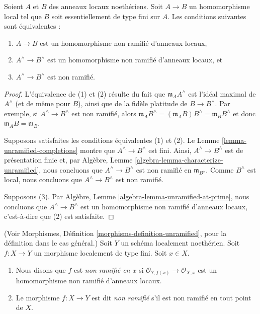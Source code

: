\begin{lemma}
\label{lemma-characterize-unramified-completions}
Soient $A$ et $B$ des anneaux locaux noethériens.
Soit $A \to B$ un homomorphisme local tel que $B$ soit
essentiellement de type fini sur $A$.
Les conditions suivantes sont équivalentes :
\begin{enumerate}
\item $A \to B$ est un homomorphisme non ramifié d'anneaux locaux,
\item $A^\wedge \to B^\wedge$ est un homomorphisme non ramifié d'anneaux locaux, et
\item $A^\wedge \to B^\wedge$ est non ramifié.
\end{enumerate}
\end{lemma}

\begin{proof}
L'équivalence de (1) et (2) résulte du fait que
$\mathfrak m_AA^\wedge$ est l'idéal maximal de $A^\wedge$
(et de même pour $B$), ainsi que de la fidèle platitude de $B \to B^\wedge$.
Par exemple, si $A^\wedge \to B^\wedge$ est non ramifié, alors
$\mathfrak m_AB^\wedge = (\mathfrak m_AB)B^\wedge = \mathfrak m_BB^\wedge$
et donc $\mathfrak m_AB = \mathfrak m_B$.

\medskip\noindent
Supposons satisfaites les conditions équivalentes (1) et (2).
Le Lemme \ref{lemma-unramified-completions}
montre que $A^\wedge \to B^\wedge$ est
fini. Ainsi, $A^\wedge \to B^\wedge$ est de présentation finie et, par
Algèbre, Lemme \ref{algebra-lemma-characterize-unramified},
nous concluons que $A^\wedge \to B^\wedge$ est non ramifié en
$\mathfrak m_{B^\wedge}$. Comme $B^\wedge$ est local, nous concluons
que $A^\wedge \to B^\wedge$ est non ramifié.

\medskip\noindent
Supposons (3). Par Algèbre, Lemme \ref{algebra-lemma-unramified-at-prime},
nous concluons que $A^\wedge \to B^\wedge$ est un homomorphisme non ramifié
d'anneaux locaux, c'est-à-dire que (2) est satisfaite.
\end{proof}

\begin{definition}
\label{definition-unramified-schemes}
(Voir Morphismes, Définition \ref{morphisms-definition-unramified},
pour la définition dans le cas général.)
Soit $Y$ un schéma localement noethérien.
Soit $f : X \to Y$ un morphisme localement de type fini.
Soit $x \in X$.
\begin{enumerate}
\item Nous disons que $f$ est {\it non ramifié en $x$} si
$\mathcal{O}_{Y, f(x)} \to \mathcal{O}_{X, x}$
est un homomorphisme non ramifié d'anneaux locaux.
\item Le morphisme $f : X \to Y$ est dit {\it non ramifié}
s'il est non ramifié en tout point de $X$.
\end{enumerate}
\end{definition}


